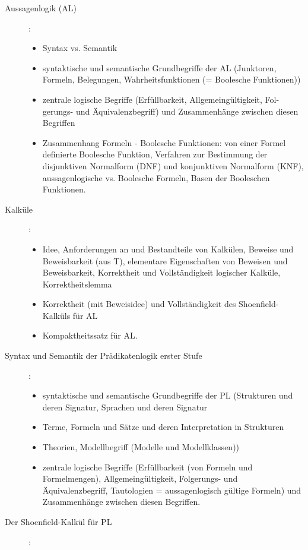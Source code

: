 \documentclass[12pt,a4paper]{article} %
\begin{document}
	\begin{description}
		\item[Aussagenlogik (AL)]:
		\begin{itemize}
			\item Syntax vs. Semantik
			\item syntaktische und semantische Grundbegriffe der AL (Junktoren, Formeln, Belegungen, Wahrheitsfunktionen (= Boolesche Funktionen))
			\item zentrale logische Begriffe (Erfüllbarkeit, Allgemeingültigkeit, Fol-gerungs- und Äquivalenzbegriff) und Zusammenhänge zwischen diesen Begriffen
			\item Zusammenhang Formeln - Boolesche Funktionen: von einer Formel definierte Boolesche Funktion, Verfahren zur Bestimmung der disjunktiven Normalform (DNF) und konjunktiven Normalform (KNF), aussagenlogische vs. Boolesche Formeln, Basen der Booleschen Funktionen.
		\end{itemize}
		\item[Kalküle]:
		\begin{itemize}
			\item Idee, Anforderungen an und Bestandteile von Kalkülen, Beweise und Beweisbarkeit (aus T), elementare Eigenschaften von Beweisen und Beweisbarkeit, Korrektheit und Vollständigkeit logischer Kalküle, Korrektheitslemma
			\item Korrektheit (mit Beweisidee) und Vollständigkeit des Shoenfield-Kalküls für AL
			\item Kompaktheitssatz für AL. 
		\end{itemize}
		\item[Syntax und Semantik der Prädikatenlogik erster Stufe]: 		
		\begin{itemize}
			\item syntaktische und semantische Grundbegriffe der PL (Strukturen und deren Signatur, Sprachen und deren Signatur
			\item Terme, Formeln und Sätze und deren Interpretation in Strukturen
			\item Theorien, Modellbegriff (Modelle und Modellklassen))
			\item zentrale logische Begriffe (Erfüllbarkeit (von Formeln und Formelmengen), Allgemeingültigkeit, Folgerungs- und Äquivalenzbegriff, Tautologien = aussagenlogisch gültige Formeln) und Zusammenhänge zwischen diesen Begriffen.
		\end{itemize}
		\item[Der Shoenfield-Kalkül für PL]:
		\begin{itemize}

\end{itemize}
\end{description}
\end{document}
